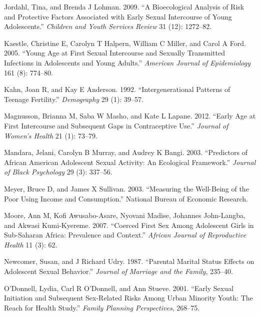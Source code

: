 \documentclass[
]{article}
\newlength{\cslhangindent}
\newenvironment{cslreferences}%
  {\setlength{\parindent}{0pt}%
  \everypar{\setlength{\hangindent}{\cslhangindent}}\ignorespaces}%
  {\par}
\begin{document}
\begin{cslreferences}
\leavevmode\hypertarget{ref-jordahl2009bioecological}{}%
Jordahl, Tina, and Brenda J Lohman. 2009. ``A Bioecological Analysis of
Risk and Protective Factors Associated with Early Sexual Intercourse of
Young Adolescents.'' \emph{Children and Youth Services Review} 31 (12):
1272--82.

\leavevmode\hypertarget{ref-kaestle2005young}{}%
Kaestle, Christine E, Carolyn T Halpern, William C Miller, and Carol A
Ford. 2005. ``Young Age at First Sexual Intercourse and Sexually
Transmitted Infections in Adolescents and Young Adults.'' \emph{American
Journal of Epidemiology} 161 (8): 774--80.

\leavevmode\hypertarget{ref-kahn1992intergenerational}{}%
Kahn, Joan R, and Kay E Anderson. 1992. ``Intergenerational Patterns of
Teenage Fertility.'' \emph{Demography} 29 (1): 39--57.

\leavevmode\hypertarget{ref-magnusson2012early}{}%
Magnusson, Brianna M, Saba W Masho, and Kate L Lapane. 2012. ``Early Age
at First Intercourse and Subsequent Gaps in Contraceptive Use.''
\emph{Journal of Women's Health} 21 (1): 73--79.

\leavevmode\hypertarget{ref-mandara2003predictors}{}%
Mandara, Jelani, Carolyn B Murray, and Audrey K Bangi. 2003.
``Predictors of African American Adolescent Sexual Activity: An
Ecological Framework.'' \emph{Journal of Black Psychology} 29 (3):
337--56.

\leavevmode\hypertarget{ref-meyer2003measuring}{}%
Meyer, Bruce D, and James X Sullivan. 2003. ``Measuring the Well-Being
of the Poor Using Income and Consumption.'' National Bureau of Economic
Research.

\leavevmode\hypertarget{ref-moore2007coerced}{}%
Moore, Ann M, Kofi Awusabo-Asare, Nyovani Madise, Johannes John-Langba,
and Akwasi Kumi-Kyereme. 2007. ``Coerced First Sex Among Adolescent
Girls in Sub-Saharan Africa: Prevalence and Context.'' \emph{African
Journal of Reproductive Health} 11 (3): 62.

\leavevmode\hypertarget{ref-newcomer1987parental}{}%
Newcomer, Susan, and J Richard Udry. 1987. ``Parental Marital Status
Effects on Adolescent Sexual Behavior.'' \emph{Journal of Marriage and
the Family}, 235--40.

\leavevmode\hypertarget{ref-o2001early}{}%
O'Donnell, Lydia, Carl R O'Donnell, and Ann Stueve. 2001. ``Early Sexual
Initiation and Subsequent Sex-Related Risks Among Urban Minority Youth:
The Reach for Health Study.'' \emph{Family Planning Perspectives},
268--75.


\end{cslreferences}
\end{document}
